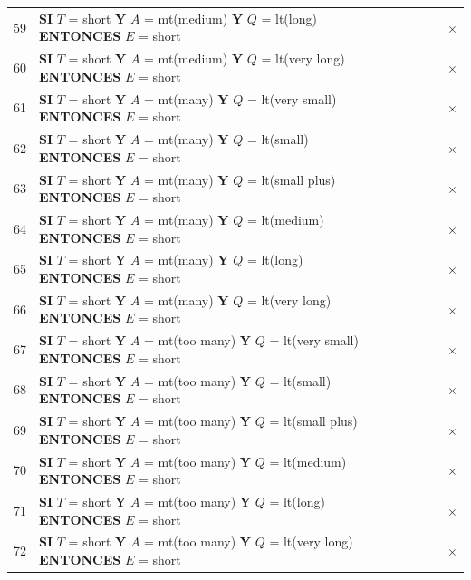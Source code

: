 {\begin{longtable}{@{}r l ccccc c@{}}
59 & \textbf{SI} $T$ = short \textbf{Y} $A$ = mt(medium) \textbf{Y} $Q$ = lt(long) \textbf{ENTONCES} $E$ = short &  &  &  &  &  & $\times$ \\
60 & \textbf{SI} $T$ = short \textbf{Y} $A$ = mt(medium) \textbf{Y} $Q$ = lt(very long) \textbf{ENTONCES} $E$ = short &  &  &  &  &  & $\times$ \\
61 & \textbf{SI} $T$ = short \textbf{Y} $A$ = mt(many) \textbf{Y} $Q$ = lt(very small) \textbf{ENTONCES} $E$ = short &  &  &  &  &  & $\times$ \\
62 & \textbf{SI} $T$ = short \textbf{Y} $A$ = mt(many) \textbf{Y} $Q$ = lt(small) \textbf{ENTONCES} $E$ = short &  &  &  &  &  & $\times$ \\
63 & \textbf{SI} $T$ = short \textbf{Y} $A$ = mt(many) \textbf{Y} $Q$ = lt(small plus) \textbf{ENTONCES} $E$ = short &  &  &  &  &  & $\times$ \\
64 & \textbf{SI} $T$ = short \textbf{Y} $A$ = mt(many) \textbf{Y} $Q$ = lt(medium) \textbf{ENTONCES} $E$ = short &  &  &  &  &  & $\times$ \\
65 & \textbf{SI} $T$ = short \textbf{Y} $A$ = mt(many) \textbf{Y} $Q$ = lt(long) \textbf{ENTONCES} $E$ = short &  &  &  &  &  & $\times$ \\
66 & \textbf{SI} $T$ = short \textbf{Y} $A$ = mt(many) \textbf{Y} $Q$ = lt(very long) \textbf{ENTONCES} $E$ = short &  &  &  &  &  & $\times$ \\
67 & \textbf{SI} $T$ = short \textbf{Y} $A$ = mt(too many) \textbf{Y} $Q$ = lt(very small) \textbf{ENTONCES} $E$ = short &  &  &  &  &  & $\times$ \\
68 & \textbf{SI} $T$ = short \textbf{Y} $A$ = mt(too many) \textbf{Y} $Q$ = lt(small) \textbf{ENTONCES} $E$ = short &  &  &  &  &  & $\times$ \\
69 & \textbf{SI} $T$ = short \textbf{Y} $A$ = mt(too many) \textbf{Y} $Q$ = lt(small plus) \textbf{ENTONCES} $E$ = short &  &  &  &  &  & $\times$ \\
70 & \textbf{SI} $T$ = short \textbf{Y} $A$ = mt(too many) \textbf{Y} $Q$ = lt(medium) \textbf{ENTONCES} $E$ = short &  &  &  &  &  & $\times$ \\
71 & \textbf{SI} $T$ = short \textbf{Y} $A$ = mt(too many) \textbf{Y} $Q$ = lt(long) \textbf{ENTONCES} $E$ = short &  &  &  &  &  & $\times$ \\
72 & \textbf{SI} $T$ = short \textbf{Y} $A$ = mt(too many) \textbf{Y} $Q$ = lt(very long) \textbf{ENTONCES} $E$ = short &  &  &  &  &  & $\times$ \\
\midrule

\end{longtable}}
